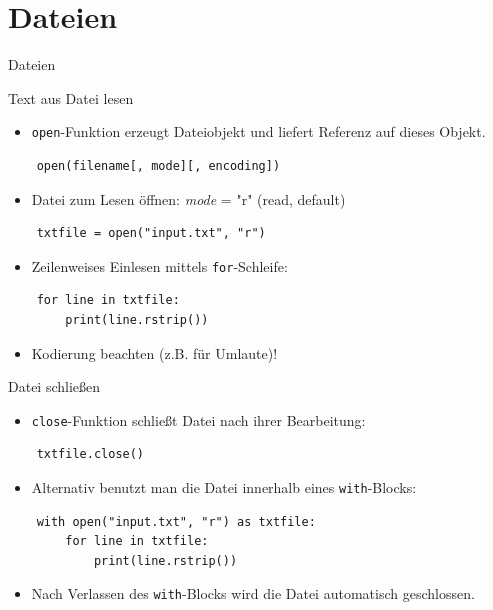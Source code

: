 \documentclass[utf8, smaller, c]{beamer}
\renewcommand{\tt}[1]{{\texttt{#1}}}
\begin{document}
\section{Dateien}
\begin{frame}{Dateien}
	\begin{block}{Text aus Datei lesen}
		\begin{itemize}
			\item \tt{open}-Funktion erzeugt Dateiobjekt und liefert Referenz auf dieses Objekt.
		\end{itemize}
		\begin{lstlisting}
	open(filename[, mode][, encoding])
		\end{lstlisting}
		\begin{itemize}
			\item Datei zum Lesen öffnen: \textit{mode} = "r" (read, default)
		\end{itemize}
		\begin{lstlisting}
	txtfile = open("input.txt", "r")
		\end{lstlisting}
		\begin{itemize}
			\item Zeilenweises Einlesen mittels \tt{for}-Schleife:
		\end{itemize}
		\begin{lstlisting}
	for line in txtfile:
		print(line.rstrip())
		\end{lstlisting}
		\begin{itemize}
		    \item Kodierung beachten (z.B. für Umlaute)!
		\end{itemize}
	\end{block}
	
	\pagebreak
	
	\begin{block}{Datei schließen}
		\begin{itemize}
			\item \tt{close}-Funktion schließt Datei nach ihrer Bearbeitung:
		\end{itemize}
		\begin{lstlisting}
	txtfile.close()
		\end{lstlisting}
		\begin{itemize}
			\item Alternativ benutzt man die Datei innerhalb eines \tt{with}-Blocks:
		\end{itemize}			
		\begin{lstlisting}
	with open("input.txt", "r") as txtfile:
		for line in txtfile:
			print(line.rstrip())
		\end{lstlisting}
		\begin{itemize}
			\item Nach Verlassen des \tt{with}-Blocks wird die Datei automatisch geschlossen.
		\end{itemize}
	\end{block}
	

\end{frame}
\end{document}
